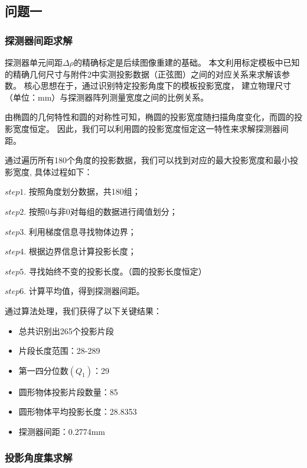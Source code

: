 \subsection{问题一}
\subsubsection{探测器间距求解}

探测器单元间距$\Delta\rho$的精确标定是后续图像重建的基础。
本文利用标定模板中已知的精确几何尺寸与附件2中实测投影数据（正弦图）之间的对应关系来求解该参数。
核心思想在于，通过识别特定投影角度下的模板投影宽度，
建立物理尺寸（单位：mm）与探测器阵列测量宽度之间的比例关系。\par


由椭圆的几何特性和圆的对称性可知，椭圆的投影宽度随扫描角度变化，而圆的投影宽度恒定。
因此，我们可以利用圆的投影宽度恒定这一特性来求解探测器间距。\par

通过遍历所有180个角度的投影数据，我们可以找到对应的最大投影宽度和最小投影宽度,
具体过程如下：\par
$step1.$ 按照角度划分数据，共180组；\par
$step2.$ 按照0与非0对每组的数据进行阈值划分；\par
$step3.$ 利用梯度信息寻找物体边界；\par
$step4.$ 根据边界信息计算投影长度；\par
$step5.$ 寻找始终不变的投影长度。（圆的投影长度恒定）\par
$step6.$ 计算平均值，得到探测器间距。

通过算法处理，我们获得了以下关键结果：
\begin{itemize}
    \item 总共识别出265个投影片段
    \item 片段长度范围：28-289
    \item 第一四分位数$(Q_1)$：29
    \item 圆形物体投影片段数量：85
    \item 圆形物体平均投影长度：28.8353
    \item 探测器间距：0.2774mm
\end{itemize}


\subsubsection{投影角度集求解}

